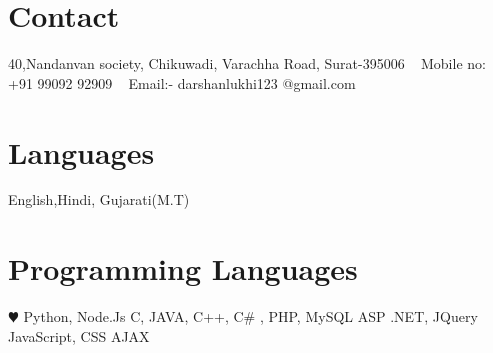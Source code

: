 \documentclass[print]{cv-style}          %
\begin{document}



\begin{aside}
%
\section{Contact}
40,Nandanvan society,
Chikuwadi,
Varachha Road,
Surat-395006
~
Mobile no:
+91 99092 92909
~
Email:-
darshanlukhi123
@gmail.com
%
\section{Languages }
{\vspace{0.1cm}}English,Hindi,
Gujarati(M.T)
%
\section{Programming
   Languages}
{\vspace{0.1cm}}{\color{red} $\varheartsuit$} Python, Node.Js
C, JAVA, C++,
C\# , PHP, MySQL
ASP .NET, JQuery
JavaScript, CSS
AJAX
%
\end{aside}


\end{document}
